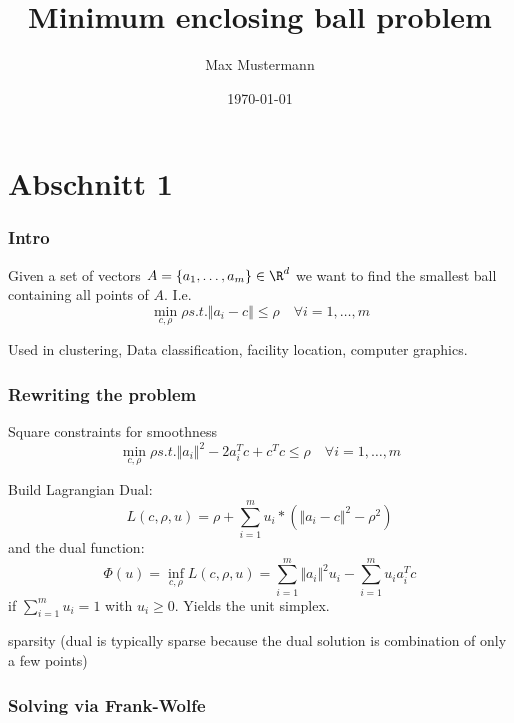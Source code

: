 \documentclass{beamer}
\title{Minimum enclosing ball problem}
\author{Max Mustermann}
\date{\today}
\begin{document}
\maketitle
\frame{\tableofcontents[currentsection]}

\section{Abschnitt 1}

\begin{frame}
  \frametitle{Intro} %
  \begin{Definition} %
    Given a set of vectors $A = \{a_1, \dots, a_m\}\in \R^d$ we want to find the smallest ball containing all points of $A$.
    I.e.
    \begin{equation}
      \min_{c,\rho}  \rho
      s.t. \Vert a_i -c  \Vert \le \rho \quad \forall i=1, \dots, m
    \end{equation}
  \end{Definition}
  Used in clustering, Data classification, facility location, computer graphics.
\end{frame}

\begin{frame}
  \frametitle{Rewriting the problem}
  Square constraints for smoothness
    \begin{equation}
      \min_{c,\rho}  \rho
      s.t. \Vert a_i \Vert^2 - 2 a_i^T c + c^T c  \le \rho \quad \forall i=1, \dots, m
    \end{equation}

    Build Lagrangian Dual:
    \begin{equation}
      L(c, \rho, u) = \rho + \sum_{i=1}^m u_i *  (\Vert a_i -c  \Vert^2- \rho^2)
    \end{equation}
    and the dual function:
    \begin{equation}
      \Phi(u) = \inf_{c, \rho} L(c, \rho, u) = \sum_{i=1}^m \Vert a_i \Vert^2u_i - \sum_{i=1}^{m} u_i a_i^T c
    \end{equation}
    if $\sum_{i=1}^{m} u_i = 1$ with $u_i \ge 0$. Yields the unit simplex.

    sparsity (dual is typically sparse because the dual solution is combination of only a few points)
\end{frame}

\begin{frame}
  \frametitle{Solving via Frank-Wolfe}

\end{frame}
\end{document}
